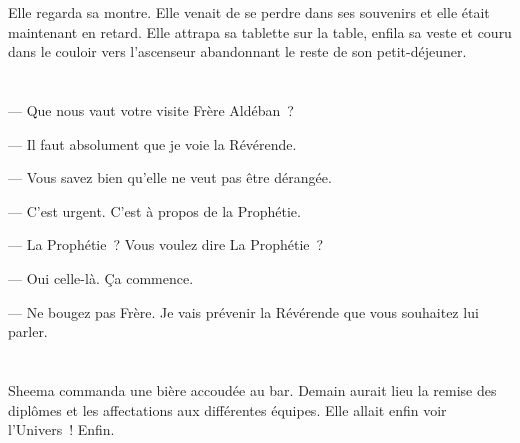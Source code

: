 Elle regarda sa montre. Elle venait de se perdre dans ses souvenirs et elle
était maintenant en retard. Elle attrapa sa tablette sur la table, enfila sa
veste et couru dans le couloir vers l’ascenseur abandonnant le reste de son
petit-déjeuner.

\section*{}
  — Que nous vaut votre visite Frère Aldéban ?

  — Il faut absolument que je voie la Révérende.

  — Vous savez bien qu'elle ne veut pas être dérangée.

  — C'est urgent. C’est à propos de la Prophétie.

  — La Prophétie ? Vous voulez dire La Prophétie ?

  — Oui celle-là. Ça commence.

  — Ne bougez pas Frère. Je vais prévenir la Révérende que vous souhaitez
lui parler.

\section*{}
Sheema commanda une bière accoudée au bar. Demain aurait lieu la remise des
diplômes et les affectations aux différentes équipes. Elle allait enfin voir
l'Univers ! Enfin.



